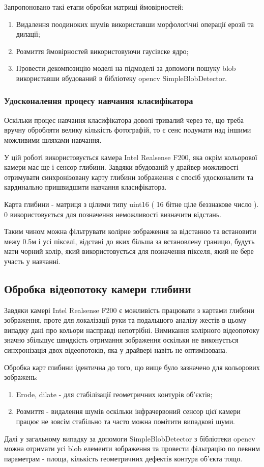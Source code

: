 Запропоновано такі етапи обробки матриці ймовірностей:
\begin{enumerate}
	\item Видалення поодиноких шумів використавши морфологічні операції ерозії та дилації;
	\item Розмиття ймовірностей використовуючи гаусівске ядро;
	\item Провести декомпозицію моделі на підмоделі за допомоги пошуку blob використавши вбудований в бібліотеку opencv SimpleBlobDetector.
\end{enumerate}

\subsubsection{Удосконалення процесу навчання класифікатора}

Оскільки процес навчання класифікатора доволі тривалий через те, що треба вручну обробляти велику кількість фотографій, то є сенс подумати над іншими можливими шляхами навчання.

У цій роботі використовується камера Intel Realsense F200, яка окрім кольорової камери має ще і сенсор глибини. Завдяки вбудованій у драйвер можливості отримувати синхронізовану карту глибини зображення є спосіб удосконалити та кардинально пришвидшити навчання класифікатора.

Карта глибини - матриця з цілими типу uint16 ( 16 бітне ціле беззнакове число ). 0 використовується для позначення неможливості визначити відстань.

Таким чином можна фільтрувати колірне зображення за відстанню та встановити межу 0.5м і усі пікселі, відстані до яких більша за встановлену границю, будуть мати чорний колір, який використовується для позначення пікселя, який не бере участь у навчанні.

\subsection{Обробка відеопотоку камери глибини}
Завдяки камері Intel Realsense F200 є можливість працювати з картами глибини зображення, проте для локалізації руки та подальшого аналізу жестів в цьому випадку дані про кольори насправді непотрібні. Вимикання колірного відеопотоку значно збільшує швидкість отримання зображення оскільки не виконується синхронізація двох відеопотоків, яка у драйвері навіть не оптимізована.

Обробка карт глибини ідентична до того, що вище було зазначено для кольорових зображень:
\begin{enumerate}
	\item Erode, dilate - для стабілізації геометричних контурів об'єктів;
	\item Розмиття - видалення шумів оскільки інфрачервоний сенсор цієї камери працює не зовсім стабільно та часто можна помітити випадкові шуми.
\end{enumerate}

Далі у загальному випадку за допомоги SimpleBlobDetector з бібліотеки opencv можна отримати усі blob елементи зображення та провести фільтрацію по певним параметрам - площа, кількість геометричних дефектів контура об'єкта тощо.